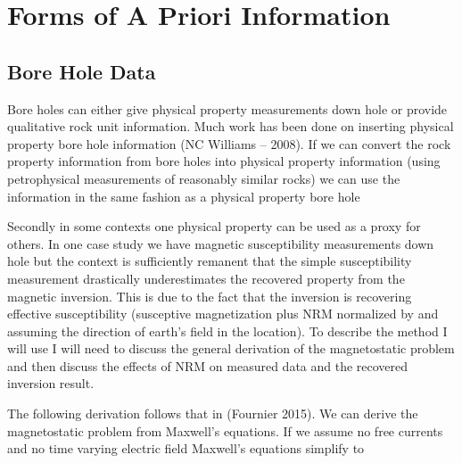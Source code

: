 \section{Forms of A Priori Information}
\label{sec:Forms of A Priori Information}

\subsection{Bore Hole Data}
\label{sec: Bore Hole Data}

Bore holes can either give physical property measurements down hole or provide qualitative rock unit information. Much work has been done on inserting physical property bore hole information (NC Williams – 2008). If we can convert the  rock property information from bore holes into physical property information (using petrophysical measurements of reasonably similar rocks) we can use the information in the same fashion as a physical property bore hole

Secondly in some contexts one physical property can be used as a proxy for others. In one case study we have magnetic susceptibility measurements down hole but the context is sufficiently remanent that the simple susceptibility measurement drastically underestimates the recovered property from the magnetic inversion. This is due to the fact that the inversion is recovering effective susceptibility (susceptive magnetization plus \ac{NRM} normalized by and assuming the direction of earth's field in the location). To describe the method I will use I will need to discuss the general derivation of the magnetostatic problem and then discuss the effects of \ac{NRM} on measured data and the recovered inversion result. 

The following derivation follows that in (Fournier 2015). We can derive the magnetostatic problem from Maxwell's equations. If we assume no free currents and no time varying electric field Maxwell's equations simplify to 

